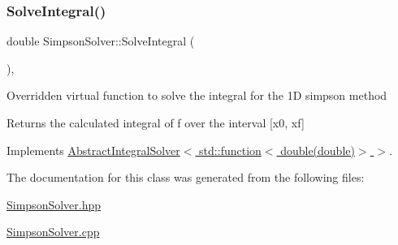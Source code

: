 \subsubsection{\texorpdfstring{Solve\+Integral()}{SolveIntegral()}}
{\footnotesize\ttfamily double Simpson\+Solver\+::\+Solve\+Integral (\begin{DoxyParamCaption}{ }\end{DoxyParamCaption})\hspace{0.3cm}{\ttfamily [override]}, {\ttfamily [virtual]}}

Overridden virtual function to solve the integral for the 1D simpson method \begin{DoxyReturn}{Returns}
the calculated integral of f over the interval \mbox{[}x0, xf\mbox{]} 
\end{DoxyReturn}


Implements \hyperlink{class_abstract_integral_solver_ad87cb44c5ef3122bc95be48f473ba399}{Abstract\+Integral\+Solver$<$ std\+::function$<$ double(double)$>$ $>$}.



The documentation for this class was generated from the following files\+:\begin{DoxyCompactItemize}
\item 
\hyperlink{_simpson_solver_8hpp}{Simpson\+Solver.\+hpp}\item 
\hyperlink{_simpson_solver_8cpp}{Simpson\+Solver.\+cpp}\end{DoxyCompactItemize}
